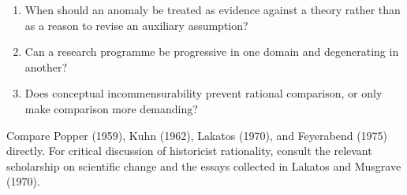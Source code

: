 \begin{discussion}
\begin{enumerate}
\item When should an anomaly be treated as evidence against a theory rather
than as a reason to revise an auxiliary assumption?
\item Can a research programme be progressive in one domain and degenerating in
another?
\item Does conceptual incommensurability prevent rational comparison, or only
make comparison more demanding?
\end{enumerate}
\end{discussion}

\begin{furtherreading}
Compare Popper (1959), Kuhn (1962), Lakatos (1970), and Feyerabend (1975)
directly. For critical discussion of historicist rationality, consult the
relevant scholarship on scientific change and the essays collected in
Lakatos and Musgrave (1970).
\end{furtherreading}

